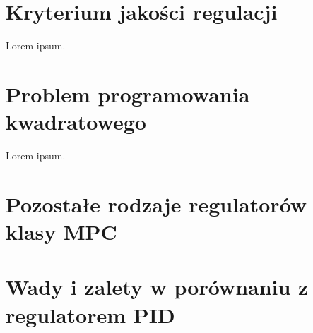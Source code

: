 \section{Kryterium jakości regulacji} \label{sec:quality}
Lorem ipsum.

\section{Problem programowania kwadratowego} \label{sec:qp}
Lorem ipsum.

\section{Pozostałe rodzaje regulatorów klasy MPC} \label{sec:other}

\section{Wady i zalety w porównaniu z regulatorem PID} \label{sec:comparison}
